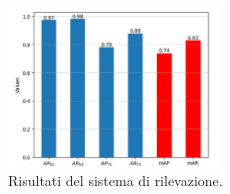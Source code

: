 \begin{figure}[htbp]
    \centering
    \includegraphics[width=0.5\textwidth]{figures/safety-system-results.png}
    \caption{Risultati del sistema di rilevazione.}
    \label{fig:safety-system-res}
\end{figure}  